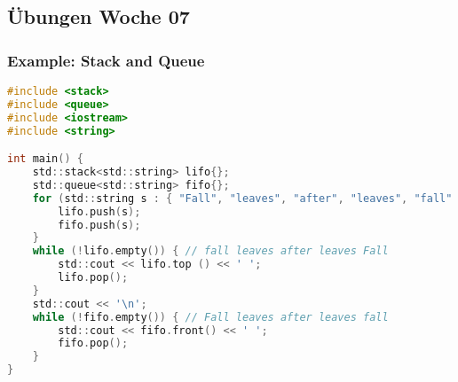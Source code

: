 
\subsection{Übungen Woche 07}
\subsubsection{Example: Stack and Queue}
\begin{lstlisting}[style=frame, style= linenumbers, language=C]
#include <stack>
#include <queue>
#include <iostream>
#include <string>

int main() {
    std::stack<std::string> lifo{};
    std::queue<std::string> fifo{};
    for (std::string s : { "Fall", "leaves", "after", "leaves", "fall" }) {
        lifo.push(s);
        fifo.push(s);
    }
    while (!lifo.empty()) { // fall leaves after leaves Fall
        std::cout << lifo.top () << ' ';
        lifo.pop();
    }
    std::cout << '\n';
    while (!fifo.empty()) { // Fall leaves after leaves fall
        std::cout << fifo.front() << ' ';
        fifo.pop();
    }
}
\end{lstlisting}